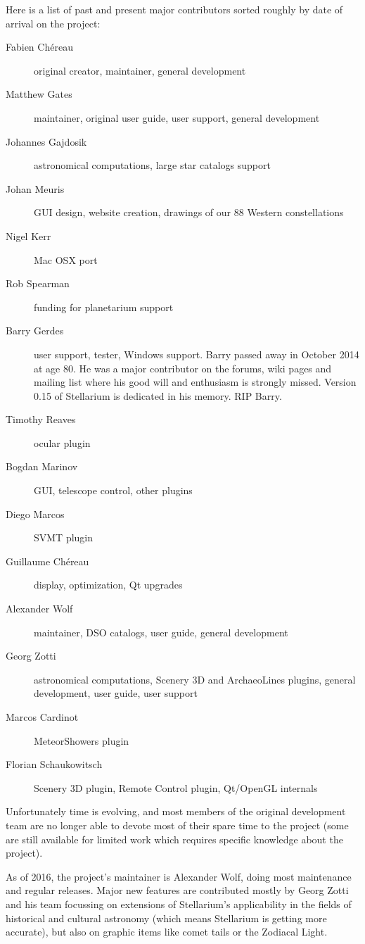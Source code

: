 Here is a list of past and present major contributors sorted roughly by date of
arrival on the project:
\newpage
\begin{description}
\item[Fabien Ch\'ereau] original creator, maintainer, general development
\item[Matthew Gates] maintainer, original user guide, user support, general development
\item[Johannes Gajdosik] astronomical computations, large star catalogs support
\item[Johan Meuris] GUI design, website creation, drawings of our 88 Western constellations
\item[Nigel Kerr] Mac OSX port
\item[Rob Spearman] funding for planetarium support
\item[Barry Gerdes] user support, tester, Windows support. Barry
  passed away in October 2014 at age 80. He was a major contributor on
  the forums, wiki pages and mailing list where his good will and
  enthusiasm is strongly missed. Version 0.15 of Stellarium is
  dedicated in his memory. RIP Barry.
\item[Timothy Reaves] ocular plugin
\item[Bogdan Marinov] GUI, telescope control, other plugins
\item[Diego Marcos] SVMT plugin
\item[Guillaume Ch\'ereau] display, optimization, Qt upgrades
\item[Alexander Wolf] maintainer, DSO catalogs, user guide, general development
\item[Georg Zotti] astronomical computations, Scenery 3D and ArchaeoLines plugins, general development, user guide, user support
\item[Marcos Cardinot] MeteorShowers plugin
\item[Florian Schaukowitsch] Scenery 3D plugin, Remote Control plugin, Qt/OpenGL internals
\end{description}

Unfortunately time is evolving, and most members of the original
development team are no longer able to devote most of their spare time
to the project (some are still available for limited work
which requires specific knowledge about the project).

As of 2016, the project's maintainer is Alexander Wolf, doing most maintenance
and regular releases. Major new features are contributed mostly by Georg Zotti
and his team focussing on extensions of Stellarium's applicability in the fields of
historical and cultural astronomy (which means Stellarium is getting more
accurate), but also on graphic items like comet tails or the Zodiacal Light.

